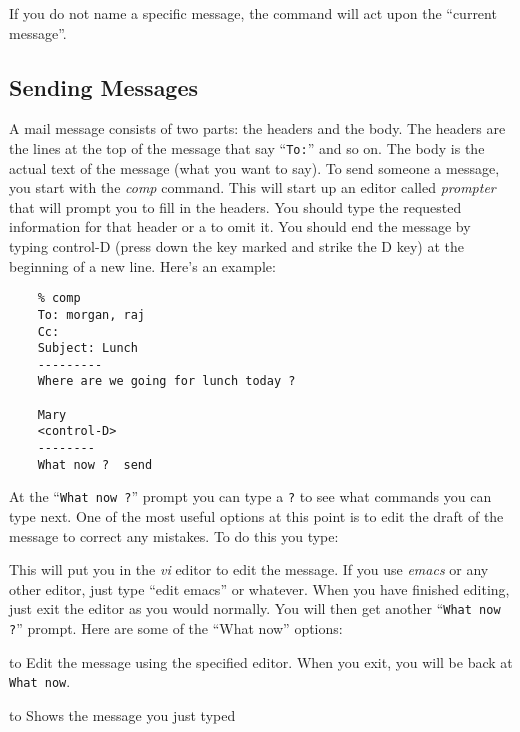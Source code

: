 \bigskip

If you do not name a specific message, the command will act upon
the ``current message''.

\subsection{Sending Messages}

A mail message consists of two parts: the headers and the body.  The
headers are the lines at the top of the message that say ``{\tt To:}''
and so on.  The body is the actual text of the message (what you
want to say).  To send someone a message, you start with the
{\it comp\/} command.  This will start up an editor called {\it prompter\/}
that will prompt you to fill in the headers. You should type the
requested information for that header or a  to omit it.  
You should end the message by typing control-D (press down the key
marked  and strike the D key) at the beginning of a new
line.  Here's an example:

\begin{verbatim}
	% comp
	To: morgan, raj
	Cc: 
	Subject: Lunch
	---------
	Where are we going for lunch today ?  

	Mary
	<control-D>
	--------
	What now ?  send
\end{verbatim}

At the ``\verb|What now ?|'' prompt you can type a {\tt?} to see 
what commands you can type next.
One of the most useful options at this point is to edit the draft
of the message to correct any mistakes.  To do this you type:


This will put you in the {\it vi\/} editor to edit the message.  If you use
{\it emacs\/} or any other editor, just type ``edit emacs'' or whatever.
When you have finished editing, just exit the editor as you would 
normally.  You will then get another ``\verb|What now ?|'' prompt. Here are some
of the ``What now'' options:

\bigskip

\begingroup
\def\titem[#1]{\par\hangafter=1\hangindent=1.4in\noindent
	\hbox to\hangindent{\hfil#1\qquad}\ignorespaces}

\titem[\tt edit \it editor\/] Edit the message using the specified
				editor.  When you exit, you will be
				back at \verb|What now|.

\titem[\tt list] Shows the message you just typed

